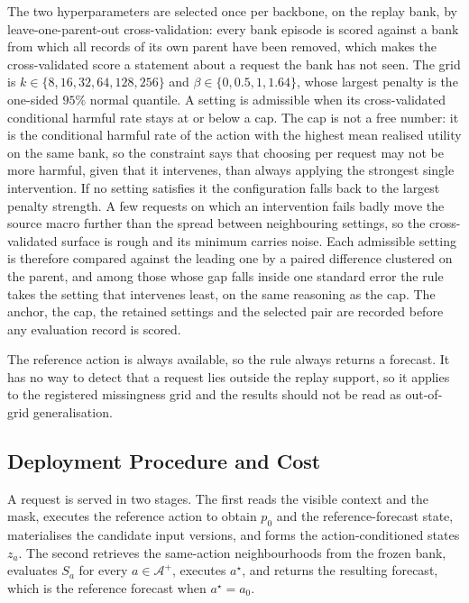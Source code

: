 \documentclass{article}
\newcommand{\calA}{\mathcal{A}}
\begin{document}
The two hyperparameters are selected once per backbone, on the replay bank, by
leave-one-parent-out cross-validation: every bank episode is scored against a bank from which
all records of its own parent have been removed, which makes the cross-validated score a
statement about a request the bank has not seen. The grid is
$k \in \{8, 16, 32, 64, 128, 256\}$ and $\beta \in \{0, 0.5, 1, 1.64\}$, whose largest penalty
is the one-sided $95\%$ normal quantile. A setting is admissible when its cross-validated
conditional harmful rate stays at or below a cap. The cap is not a free number: it is the conditional harmful rate of the action
with the highest mean realised utility on the same bank, so the constraint says that choosing
per request may not be more harmful, given that it intervenes, than always applying the
strongest single intervention. If no setting satisfies it the configuration falls back to the
largest penalty strength. A few requests on which an intervention fails badly move the source
macro further than the spread between neighbouring settings, so the cross-validated surface is
rough and its minimum carries noise. Each admissible setting is therefore compared against the
leading one by a paired difference clustered on the parent, and among those whose gap falls
inside one standard error the rule takes the setting that intervenes least, on the same
reasoning as the cap. The anchor, the cap, the retained settings and the selected pair are
recorded before any evaluation record is scored.

The reference action is always available, so the rule always returns a forecast. It has no way
to detect that a request lies outside the replay support, so it applies to the registered
missingness grid and the results should not be read as out-of-grid generalisation.

\subsection{Deployment Procedure and Cost}
\label{sec:method-deploy}
A request is served in two stages. The first reads the visible context and the mask, executes
the reference action to obtain $p_0$ and the reference-forecast state, materialises the
candidate input versions, and forms the action-conditioned states $z_a$. The second retrieves
the same-action neighbourhoods from the frozen bank, evaluates $S_a$ for every
$a \in \calA^{+}$, executes $a^{\star}$, and returns the resulting forecast, which is the
reference forecast when $a^{\star} = a_0$.
\end{document}
